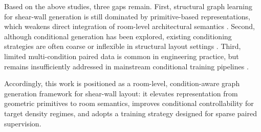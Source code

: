 Based on the above studies, three gaps remain. First, structural graph learning for shear-wall generation is still dominated by primitive-based representations, which weakens direct integration of room-level architectural semantics \cite{zhaoIntelligentDesignShear2023b,zhaoDesignconditioninformedShearWall2023d}.  
Second, although conditional generation has been explored, existing conditioning strategies are often coarse or inflexible in structural layout settings \cite{liaoIntelligentGenerativeStructural2022a,guIntelligentDesignShear2024,zhaoDesignconditioninformedShearWall2023d,perezFiLMVisualReasoning2018}.  
Third, limited multi-condition paired data is common in engineering practice, but remains insufficiently addressed in mainstream conditional training pipelines \cite{liaoAutomatedStructuralDesign2021a,luIntelligentStructuralDesign2022a,dasConditionalSyntheticData2022,pavlloControllingStyleSemantics2020}.

Accordingly, this work is positioned as a room-level, condition-aware graph generation framework for shear-wall layout: it elevates representation from geometric primitives to room semantics, improves conditional controllability for target density regimes, and adopts a training strategy designed for sparse paired supervision.

